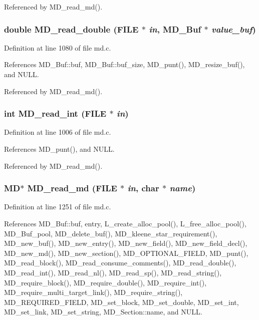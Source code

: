 Referenced by MD\_\-read\_\-md().
\subsubsection{\setlength{\rightskip}{0pt plus 5cm}double MD\_\-read\_\-double (FILE $\ast$ {\em in}, \bf{MD\_\-Buf} $\ast$ {\em value\_\-buf})}\label{md_8c_0cb3f4fb0d1e99632ebaafa67d1c57e8}




Definition at line 1080 of file md.c.

References MD\_\-Buf::buf, MD\_\-Buf::buf\_\-size, MD\_\-punt(), MD\_\-resize\_\-buf(), and NULL.

Referenced by MD\_\-read\_\-md().
\subsubsection{\setlength{\rightskip}{0pt plus 5cm}int MD\_\-read\_\-int (FILE $\ast$ {\em in})}\label{md_8c_9b09b2ce2346e96de0a8154e41175695}




Definition at line 1006 of file md.c.

References MD\_\-punt(), and NULL.

Referenced by MD\_\-read\_\-md().
\subsubsection{\setlength{\rightskip}{0pt plus 5cm}\bf{MD}$\ast$ MD\_\-read\_\-md (FILE $\ast$ {\em in}, char $\ast$ {\em name})}\label{md_8c_0574c5322b5fd565ffc5adfc2e6e8614}




Definition at line 1251 of file md.c.

References MD\_\-Buf::buf, entry, L\_\-create\_\-alloc\_\-pool(), L\_\-free\_\-alloc\_\-pool(), MD\_\-Buf\_\-pool, MD\_\-delete\_\-buf(), MD\_\-kleene\_\-star\_\-requirement(), MD\_\-new\_\-buf(), MD\_\-new\_\-entry(), MD\_\-new\_\-field(), MD\_\-new\_\-field\_\-decl(), MD\_\-new\_\-md(), MD\_\-new\_\-section(), MD\_\-OPTIONAL\_\-FIELD, MD\_\-punt(), MD\_\-read\_\-block(), MD\_\-read\_\-consume\_\-comments(), MD\_\-read\_\-double(), MD\_\-read\_\-int(), MD\_\-read\_\-nl(), MD\_\-read\_\-sp(), MD\_\-read\_\-string(), MD\_\-require\_\-block(), MD\_\-require\_\-double(), MD\_\-require\_\-int(), MD\_\-require\_\-multi\_\-target\_\-link(), MD\_\-require\_\-string(), MD\_\-REQUIRED\_\-FIELD, MD\_\-set\_\-block, MD\_\-set\_\-double, MD\_\-set\_\-int, MD\_\-set\_\-link, MD\_\-set\_\-string, MD\_\-Section::name, and NULL.
